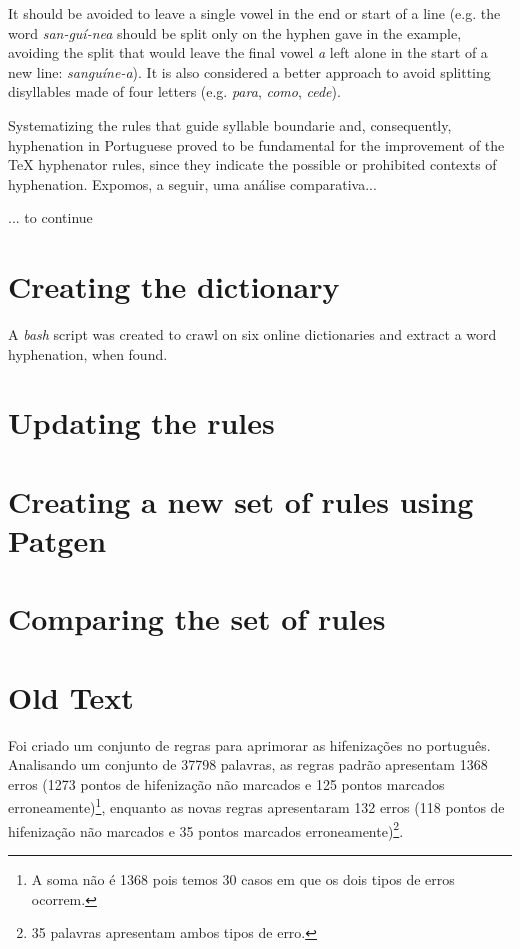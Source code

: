 \documentclass{article}
\begin{document}
It should be avoided to leave a single vowel in the end or start of a line (e.g.
the word \emph{san-guí-nea} should be split only on the hyphen gave in the
example, avoiding the split that would leave the final vowel \emph{a}
left alone in the start of a new line: \emph{sanguíne-a}). It is also considered a better approach
to avoid splitting disyllables made of four letters (e.g. \emph{para},
\emph{como}, \emph{cede}).


Systematizing the rules that guide syllable boundarie and, consequently,
hyphenation in Portuguese proved to be fundamental for the improvement of the
\TeX{} hyphenator rules, since they indicate the possible or prohibited contexts
of hyphenation. Expomos, a seguir, uma análise comparativa...

... to continue
\vspace{10ex}



\section{Creating the dictionary}
A \emph{bash} script was created to crawl on six online dictionaries and extract a word hyphenation, when found. 



\section{Updating the rules}


\section{Creating a new set of rules using Patgen}


\section{Comparing the set of rules}


\section{Old Text}


Foi criado um conjunto de \NumberOfNewRules{} regras para aprimorar as hifenizações no
português. Analisando um conjunto de 37798 palavras, as regras padrão apresentam
1368 erros (1273 pontos de hifenização não marcados e 125 pontos marcados
erroneamente)\footnote{A soma não é 1368 pois temos 30 casos em que os dois
tipos de erros ocorrem.}, enquanto as novas regras apresentaram 132 erros (118
pontos de hifenização não marcados e 35 pontos marcados
erroneamente)\footnote{35 palavras apresentam ambos tipos de erro.}.
\end{document}
